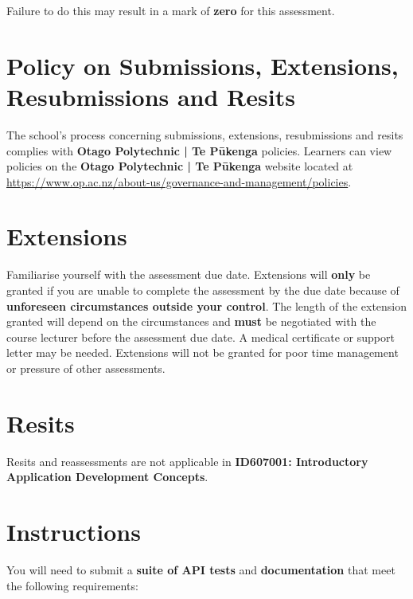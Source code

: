 \documentclass{article}
\begin{document}
 Failure to do this may result in a mark of \textbf{zero} for this assessment.

\section*{Policy on Submissions, Extensions, Resubmissions and Resits}
The school's process concerning submissions, extensions, resubmissions and resits complies with \textbf{Otago Polytechnic | Te Pūkenga} policies. Learners can view policies on the \textbf{Otago Polytechnic | Te Pūkenga} website located at \href{https://www.op.ac.nz/about-us/governance-and-management/policies}{https://www.op.ac.nz/about-us/governance-and-management/policies}. 

\section*{Extensions}
Familiarise yourself with the assessment due date. Extensions will \textbf{only} be granted if you are unable to complete the assessment by the due date because of \textbf{unforeseen circumstances outside your control}. The length of the extension granted will depend on the circumstances and \textbf{must} be negotiated with the course lecturer before the assessment due date. A medical certificate or support letter may be needed. Extensions will not be granted for poor time management or pressure of other assessments.

\section*{Resits}
Resits and reassessments are not applicable in \textbf{ID607001: Introductory Application Development Concepts}. 

\newpage

\section*{Instructions}
You will need to submit a \textbf{suite of API tests} and \textbf{documentation} that meet the following requirements:
\end{document}

